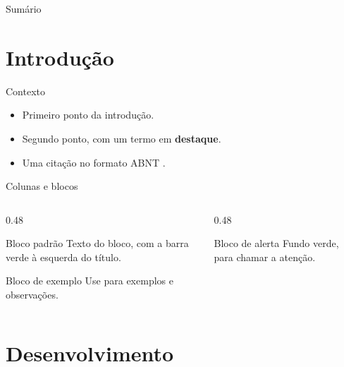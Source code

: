 \documentclass[aspectratio=169]{beamer}
\begin{document}
\begin{frame}[plain]
  \titlepage
\end{frame}

\begin{frame}{Sumário}
  \tableofcontents
\end{frame}

\section{Introdução}

\begin{frame}{Contexto}
  \begin{itemize} \itemsep1em
    \item Primeiro ponto da introdução.
    \item Segundo ponto, com um termo em \textbf{destaque}.
    \item Uma citação no formato ABNT \cite{ifmg:2020:manual}.
  \end{itemize}
\end{frame}

\begin{frame}{Colunas e blocos}
  \begin{columns}[T]
    \begin{column}{0.48\linewidth}
      \begin{block}{Bloco padrão}
        Texto do bloco, com a barra verde à esquerda do título.
      \end{block}
      \begin{exampleblock}{Bloco de exemplo}
        Use para exemplos e observações.
      \end{exampleblock}
    \end{column}
    \begin{column}{0.48\linewidth}
      \begin{alertblock}{Bloco de alerta}
        Fundo verde, para chamar a atenção.
      \end{alertblock}
    \end{column}
  \end{columns}
\end{frame}

\section{Desenvolvimento}
\end{document}
